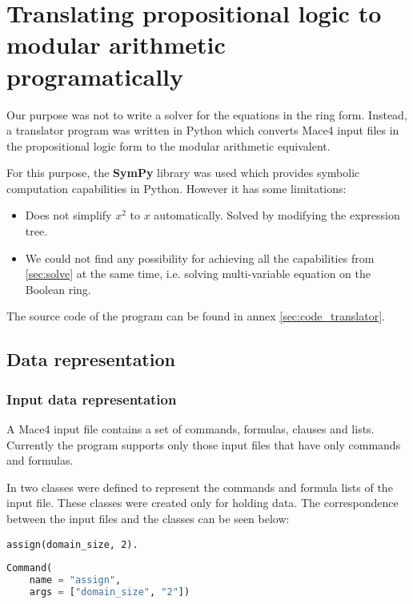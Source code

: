 \section{Translating propositional logic to modular arithmetic programatically}
\label{sec:translate}

Our purpose was not to write a solver for the equations in the ring form. Instead, a translator program was written in Python which converts Mace4 input files in the propositional logic form to the modular arithmetic equivalent.

For this purpose, the \textbf{SymPy} library was used which provides symbolic computation capabilities in Python. However it has some limitations: 

\begin{itemize}
\item Does not simplify $x^2$ to $x$ automatically. Solved by modifying the expression tree.
\item We could not find any possibility for achieving all the capabilities from \ref{sec:solve} at the same time, i.e. solving multi-variable equation on the Boolean ring.
\end{itemize}

The source code of the program can be found in annex  \ref{sec:code_translator}.





\subsection{Data representation}

\subsubsection{Input data representation}
\label{sec:rep_input}

A Mace4 input file contains a set of commands, formulas, clauses and lists. Currently the program supports only those input files that have only commands and formulas.

In  two  classes were defined to represent the commands and formula lists of the input file. These classes were created only for holding data. The correspondence between the input files and the classes can be seen below:

\begin{multicols}{2}

\begin{lstlisting}[title=Mace4 command]
assign(domain_size, 2).
\end{lstlisting}

\columnbreak

\begin{lstlisting}[language=Python, title=Command object creation]
Command(
    name = "assign", 
    args = ["domain_size", "2"])
\end{lstlisting}

\end{multicols}

